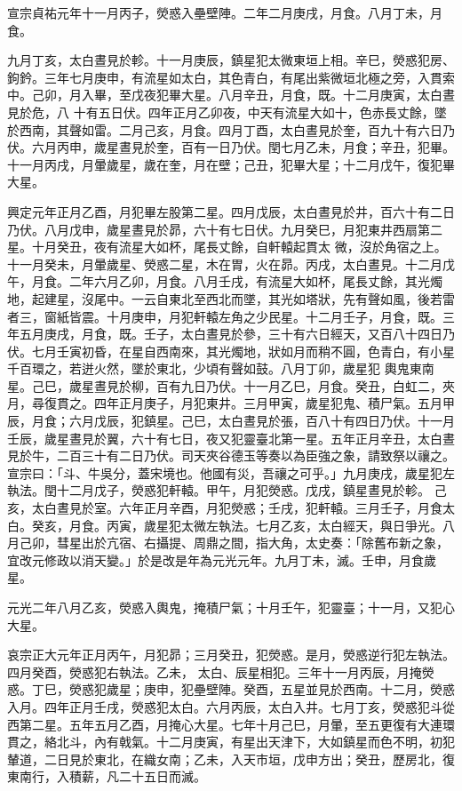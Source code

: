 \begin{pinyinscope}
 宣宗貞祐元年十一月丙子，熒惑入壘壁陣。二年二月庚戌，月食。八月丁未，月食。



 九月丁亥，太白晝見於軫。十一月庚辰，鎮星犯太微東垣上相。辛巳，熒惑犯房、鉤鈐。三年七月庚申，有流星如太白，其色青白，有尾出紫微垣北極之旁，入貫索中。己卯，月入畢，至戊夜犯畢大星。八月辛丑，月食，既。十二月庚寅，太白晝見於危，八
 十有五日伏。四年正月乙卯夜，中天有流星大如十，色赤長丈餘，墜於西南，其聲如雷。二月己亥，月食。四月丁酉，太白晝見於奎，百九十有六日乃伏。六月丙申，歲星晝見於奎，百有一日乃伏。閏七月乙未，月食；辛丑，犯畢。十一月丙戌，月暈歲星，歲在奎，月在壁；己丑，犯畢大星；十二月戊午，復犯畢大星。



 興定元年正月乙酉，月犯畢左股第二星。四月戊辰，太白晝見於井，百六十有二日乃伏。八月戊申，歲星晝見於昴，六十有七日伏。九月癸巳，月犯東井西扇第二星。十月癸丑，夜有流星大如杯，尾長丈餘，自軒轅起貫太
 微，沒於角宿之上。十一月癸未，月暈歲星、熒惑二星，木在胃，火在昴。丙戌，太白晝見。十二月戊午，月食。二年六月乙卯，月食。八月壬戌，有流星大如杯，尾長丈餘，其光燭地，起建星，沒尾中。一云自東北至西北而墜，其光如塔狀，先有聲如風，後若雷者三，窗紙皆震。十月庚申，月犯軒轅左角之少民星。十二月壬子，月食，既。三年五月庚戌，月食，既。壬子，太白晝見於參，三十有六日經天，又百八十四日乃伏。七月壬寅初昏，在星自西南來，其光燭地，狀如月而稍不圓，色青白，有小星千百環之，若迸火然，墜於東北，少頃有聲如鼓。八月丁卯，歲星犯
 輿鬼東南星。己巳，歲星晝見於柳，百有九日乃伏。十一月乙巳，月食。癸丑，白虹二，夾月，尋復貫之。四年正月庚子，月犯東井。三月甲寅，歲星犯鬼、積尸氣。五月甲辰，月食；六月戊辰，犯鎮星。己巳，太白晝見於張，百八十有四日乃伏。十一月壬辰，歲星晝見於翼，六十有七日，夜又犯靈臺北第一星。五年正月辛丑，太白晝見於牛，二百三十有二日乃伏。司天夾谷德玉等奏以為臣強之象，請致祭以禳之。宣宗曰：「斗、牛吳分，蓋宋境也。他國有災，吾禳之可乎。」九月庚戌，歲星犯左執法。閏十二月戊子，熒惑犯軒轅。甲午，月犯熒惑。戊戌，鎮星晝見於軫。
 己亥，太白晝見於室。六年正月辛酉，月犯熒惑；壬戌，犯軒轅。三月壬子，月食太白。癸亥，月食。丙寅，歲星犯太微左執法。七月乙亥，太白經天，與日爭光。八月己卯，彗星出於亢宿、右攝提、周鼎之間，指大角，太史奏：「除舊布新之象，宜改元修政以消天變。」於是改是年為元光元年。九月丁未，滅。壬申，月食歲星。



 元光二年八月乙亥，熒惑入輿鬼，掩積尸氣；十月壬午，犯靈臺；十一月，又犯心大星。



 哀宗正大元年正月丙午，月犯昴；三月癸丑，犯熒惑。是月，熒惑逆行犯左執法。四月癸酉，熒惑犯右執法。乙未，
 太白、辰星相犯。三年十一月丙辰，月掩熒惑。丁巳，熒惑犯歲星；庚申，犯壘壁陣。癸酉，五星並見於西南。十二月，熒惑入月。四年正月壬戌，熒惑犯太白。六月丙辰，太白入井。七月丁亥，熒惑犯斗從西第二星。五年五月乙酉，月掩心大星。七年十月己巳，月暈，至五更復有大連環貫之，絡北斗，內有戟氣。十二月庚寅，有星出天津下，大如鎮星而色不明，初犯輦道，二日見於東北，在織女南；乙未，入天市垣，戊申方出；癸丑，歷房北，復東南行，入積薪，凡二十五日而滅。




\end{pinyinscope}

